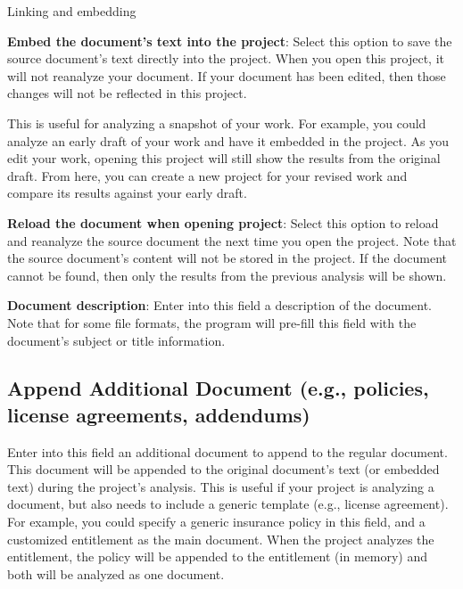 \documentclass[
]{book}
\newenvironment{optionssection}
    {
    \begin{tcolorbox}[colframe=lightgray,colback=ultralightgray,sharp corners=all,parbox=false]
    }
    {
    \end{tcolorbox}
    }
\newenvironment{optionssectiontitle}
    {
    \begin{tcolorbox}[colframe=lightgray,colback=lightgray]
    \bfseries
    }
    {
    \end{tcolorbox}
    }
\theoremstyle{definition}
\theoremstyle{definition}
\theoremstyle{definition}
\theoremstyle{definition}
\theoremstyle{remark}
\begin{document}
\begin{optionssection}

\begin{optionssectiontitle}
Linking and embedding

\end{optionssectiontitle}

\textbf{Embed the document's text into the project}: Select this option to save the source document's text directly into the project. When you open this project, it will not reanalyze your document. If your document has been edited, then those changes will not be reflected in this project.

This is useful for analyzing a snapshot of your work. For example, you could analyze an early draft of your work and have it embedded in the project. As you edit your work, opening this project will still show the results from the original draft. From here, you can create a new project for your revised work and compare its results against your early draft.

\textbf{Reload the document when opening project}: Select this option to reload and reanalyze the source document the next time you open the project. Note that the source document's content will not be stored in the project. If the document cannot be found, then only the results from the previous analysis will be shown.

\end{optionssection}

\textbf{Document description}: Enter into this field a description of the document. Note that for some file formats, the program will pre-fill this field with the document's subject or title information.

\hypertarget{additional-document}{%
\subsection*{Append Additional Document (e.g., policies, license agreements, addendums)}\label{additional-document}}

Enter into this field an additional document to append to the regular document. This document will be appended to the original document's text (or embedded text) during the project's analysis. This is useful if your project is analyzing a document, but also needs to include a generic template (e.g., license agreement). For example, you could specify a generic insurance policy in this field, and a customized entitlement as the main document. When the project analyzes the entitlement, the policy will be appended to the entitlement (in memory) and both will be analyzed as one document.
\end{document}
